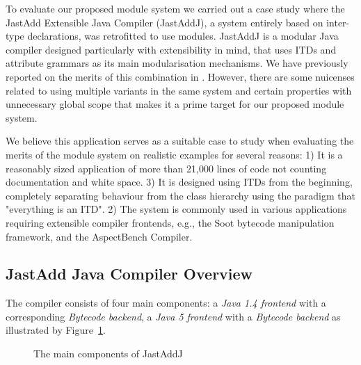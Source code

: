 To evaluate our proposed module system we carried out a case study where
the JastAdd Extensible Java Compiler (JastAddJ), a system entirely based on
inter-type declarations, was retrofitted to use modules. JastAddJ is a
modular Java compiler designed particularly with extensibility in mind,
that uses ITDs and attribute grammars as its main modularisation
mechanisms.  We have previously reported on the merits of this combination
in \cite{aosd08abc}. However, there are some nuicenses related to using
multiple variants in the same system and certain properties with
unnecessary global scope that makes it a prime target for our proposed
module system. 

We believe this application serves as a suitable case to study when
evaluating the merits of the module system on realistic examples for
several reasons: 1) It is a reasonably sized application of more than
21,000 lines of code not counting documentation and white space.  3) It is
designed using ITDs from the beginning, completely separating behaviour
from the class hierarchy using the paradigm that "everything is an ITD". 2)
The system is commonly used in various applications requiring extensible
compiler frontends, e.g., the Soot bytecode manipulation framework, and the
AspectBench Compiler.

\subsection{JastAdd Java Compiler Overview}
\label{jastaddjoverview}
The compiler consists of four main components: a \emph{Java 1.4 frontend}
with a corresponding \emph{Bytecode backend}, a \emph{Java 5 frontend} with
a \emph{Bytecode backend} as illustrated by Figure~\ref{MainComponents}. 

\begin{figure}[htb!]
  \begin{center}
    \caption{The main components of JastAddJ}
    \label{MainComponents}
  \end{center}
\end{figure}

